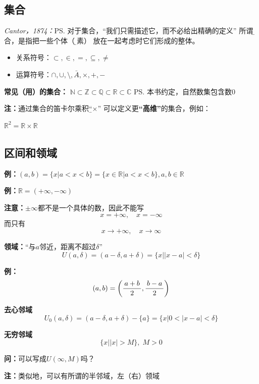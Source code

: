 \subsection{集合}

{\it Cantor，1874：}\ps{对于集合，“我们只需描述它，而不必给出精确的定义”}
所谓{\b 集合}，是指把一些个体（{\b 元素}） 放在一起考虑时它们形成的整体。
\begin{itemize}
  \item 关系符号：$\subset, \in, =, \subseteq, \neq$
  \item 运算符号：$\cap,\cup, \setminus, \bar{A}, \times, +, - $
\end{itemize}
	
{\bf 常见（用）的集合：}
$\mathbb{N}\subset\mathbb{Z}\subset\mathbb{Q}\subset\mathbb{R}\subset\mathbb{C}$
\ps{本书约定，自然数集包含数$0$}
	
{\bf 注：}通过集合的笛卡尔乘积{\b “$\times$”} 可以定义更{\bf “高维”}的集合，例如：\\
	\centerline{$\mathbb{R}^2=\mathbb{R}\times\mathbb{R}$}

\subsection{区间和领域}

{\bf 例：}$(a,b)=\{x|a<x<b\}=\{x\in\mathbb{R}|a<x<b\},a,b\in\mathbb{R}$

{\bf 例：}$\mathbb{R}=(+\infty,-\infty)$

{\bf 注意：}$\pm\infty$都不是一个具体的数，因此不能写
$$x=+\infty,\quad x=-\infty$$
而只有
$$x\to+\infty,\quad x\to\infty$$

{\bf 领域：}“与$a$邻近，距离不超过$\delta$”
$$U(a,\delta)=(a-\delta,a+\delta)=\{x||x-a|<\delta\}$$

{\bf 例：}
$$(a,b)=\left(\displaystyle\frac{\,{a+b}\,}{\,{2}\,},\displaystyle\frac{\,{b-a}\,}{\,{2}\,}\right)$$

{\bf 去心邻域}
$$U_0(a,\delta)=(a-\delta,a+\delta)-\{a\}=\{x|0<|x-a|<\delta\}$$

{\bf 无穷邻域}
$$\{x||x|>M\},\;M>0$$

{\bf 问：}可以写成$U(\infty,M)$吗？

{\bf 注：}类似地，可以有所谓的半邻域，左（右）领域

